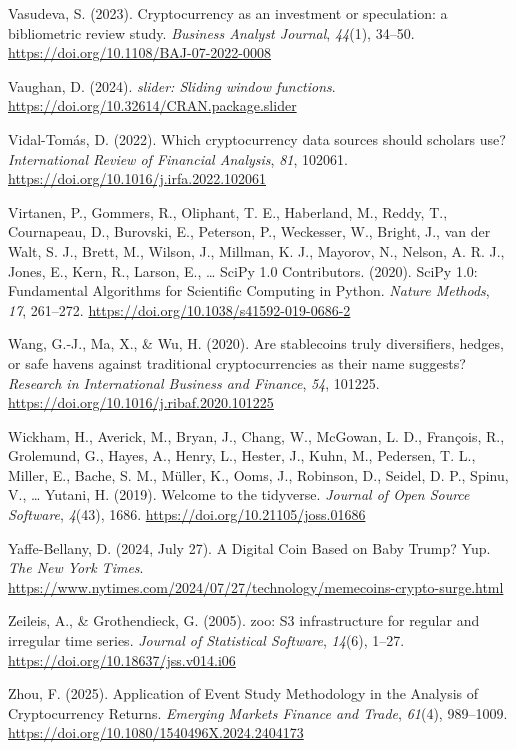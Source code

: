 \documentclass[
  12pt,
  a4paper,
  openany]{scrbook}
\newlength{\cslhangindent}
\newenvironment{CSLReferences}[2] %
 {\begin{list}{}{%
  \setlength{\itemindent}{0pt}
  \setlength{\leftmargin}{0pt}
  \setlength{\parsep}{0pt}
  \ifodd #1
   \setlength{\leftmargin}{\cslhangindent}
   \setlength{\itemindent}{-1\cslhangindent}
  \fi
  \setlength{\itemsep}{#2\baselineskip}}}
 {\end{list}}
\begin{document}
\begin{CSLReferences}{1}{0}
Vasudeva, S. (2023). Cryptocurrency as an investment or speculation: a
bibliometric review study. \emph{Business Analyst Journal},
\emph{44}(1), 34--50. \url{https://doi.org/10.1108/BAJ-07-2022-0008}

Vaughan, D. (2024). \emph{{slider}: Sliding window functions}.
\url{https://doi.org/10.32614/CRAN.package.slider}

Vidal-Tomás, D. (2022). Which cryptocurrency data sources should
scholars use? \emph{International Review of Financial Analysis},
\emph{81}, 102061. \url{https://doi.org/10.1016/j.irfa.2022.102061}

Virtanen, P., Gommers, R., Oliphant, T. E., Haberland, M., Reddy, T.,
Cournapeau, D., Burovski, E., Peterson, P., Weckesser, W., Bright, J.,
van der Walt, S. J., Brett, M., Wilson, J., Millman, K. J., Mayorov, N.,
Nelson, A. R. J., Jones, E., Kern, R., Larson, E., \ldots{} SciPy 1.0
Contributors. (2020). {{SciPy} 1.0: Fundamental Algorithms for
Scientific Computing in Python}. \emph{Nature Methods}, \emph{17},
261--272. \url{https://doi.org/10.1038/s41592-019-0686-2}

Wang, G.-J., Ma, X., \& Wu, H. (2020). Are stablecoins truly
diversifiers, hedges, or safe havens against traditional
cryptocurrencies as their name suggests? \emph{Research in International
Business and Finance}, \emph{54}, 101225.
\url{https://doi.org/10.1016/j.ribaf.2020.101225}

Wickham, H., Averick, M., Bryan, J., Chang, W., McGowan, L. D.,
François, R., Grolemund, G., Hayes, A., Henry, L., Hester, J., Kuhn, M.,
Pedersen, T. L., Miller, E., Bache, S. M., Müller, K., Ooms, J.,
Robinson, D., Seidel, D. P., Spinu, V., \ldots{} Yutani, H. (2019).
Welcome to the {tidyverse}. \emph{Journal of Open Source Software},
\emph{4}(43), 1686. \url{https://doi.org/10.21105/joss.01686}

Yaffe-Bellany, D. (2024, July 27). A Digital Coin Based on Baby Trump?
Yup. \emph{The New York Times}.
\url{https://www.nytimes.com/2024/07/27/technology/memecoins-crypto-surge.html}

Zeileis, A., \& Grothendieck, G. (2005). {zoo}: S3 infrastructure for
regular and irregular time series. \emph{Journal of Statistical
Software}, \emph{14}(6), 1--27.
\url{https://doi.org/10.18637/jss.v014.i06}

Zhou, F. (2025). Application of Event Study Methodology in the Analysis
of Cryptocurrency Returns. \emph{Emerging Markets Finance and Trade},
\emph{61}(4), 989--1009.
\url{https://doi.org/10.1080/1540496X.2024.2404173}

\end{CSLReferences}
\end{document}
